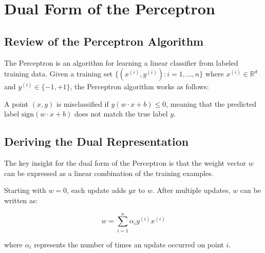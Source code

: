 \documentclass{article}
\begin{document}
\section{Dual Form of the Perceptron}

\subsection{Review of the Perceptron Algorithm}
The Perceptron is an algorithm for learning a linear classifier from labeled training data. Given a training set $\{(x^{(i)}, y^{(i)}): i=1,\ldots,n\}$ where $x^{(i)} \in \mathbb{R}^d$ and $y^{(i)} \in \{-1, +1\}$, the Perceptron algorithm works as follows:


A point $(x, y)$ is misclassified if $y(w \cdot x + b) \leq 0$, meaning that the predicted label $\text{sign}(w \cdot x + b)$ does not match the true label $y$.

\subsection{Deriving the Dual Representation}
The key insight for the dual form of the Perceptron is that the weight vector $w$ can be expressed as a linear combination of the training examples.

Starting with $w = 0$, each update adds $yx$ to $w$. After multiple updates, $w$ can be written as:

\[
w = \sum_{i=1}^{n} \alpha_i y^{(i)} x^{(i)}
\]

where $\alpha_i$ represents the number of times an update occurred on point $i$.
\end{document}
